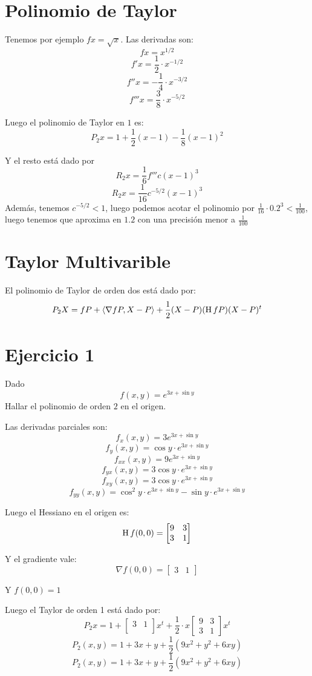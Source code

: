 \documentclass{article}
\begin{document}
\section*{Polinomio de Taylor}
Tenemos por ejemplo $fx = \sqrt{x}$. Las derivadas son:
\[f x = x^{1/2}\]
\[f' x = \frac{1}{2} \cdot x^{-1/2}\]
\[f'' x = -\frac{1}{4} \cdot x^{-3/2}\]
\[f''' x = \frac{3}{8} \cdot x^{-5/2}\]

Luego el polinomio de Taylor en $1$ es:
\[
	P_2x = 1 + \frac{1}{2}(x-1) - \frac{1}{8}(x-1)^2
\]

Y el resto está dado por \[
	R_2x = \frac{1}{6} f'''c (x-1)^3
\]
\[
	R_2x = \frac{1}{16} c ^{-5/2} (x-1)^3
\]
Además, tenemos $c^{-5/2} < 1$, luego podemos acotar el polinomio por $\frac{1}{16} \cdot 0.2^3 < \frac{1}{100}$, luego tenemos que aproxima en $1.2$ con una precisión menor a $\frac{1}{100}$

\section*{Taylor Multivarible}
El polinomio de Taylor de orden dos está dado por:
\[
	P_2X = fP + \langle \nabla fP, X-P \rangle + \frac{1}{2} (X-P) (\operatorname{H} f P) (X-P)^t
\]

\section*{Ejercicio 1}
Dado \[
	f (x,y) = e^{3x+\sin y}
\]
Hallar el polinomio de orden $2$ en el origen.

Las derivadas parciales son:
\[
	f_{x} (x,y) = 3e^{3x + \sin y}
\]
\[
	f_{y} (x,y) = \cos y \cdot e^{3x + \sin y}
\]
\[
	f_{xx} (x,y) = 9e^{3x + \sin y}
\]
\[
	f_{yx} (x,y) = 3\cos y \cdot e^{3x + \sin y}
\]
\[
f_{xy} (x,y) = 3 \cos y \cdot e^{3x + \sin y}
\]
\[
	f_{yy} (x,y) = \cos^2 y \cdot e^{3x + \sin y} - \sin y \cdot e^{3x + \sin y}
\]

Luego el Hessiano en el origen es:
\[
	\operatorname{H} f (0,0) = 
	\begin{bmatrix}
		9 & 3 \\
		3 & 1
	\end{bmatrix}
\]

Y el gradiente vale:
\[
	\nabla f (0,0) =
	\begin{bmatrix}
		3 & 1
	\end{bmatrix}
\]

Y $f (0,0) = 1$

Luego el Taylor de orden 1 está dado por:
\[
	P_2 x = 1 + 
	\begin{bmatrix}
		3 & 1 \\
	\end{bmatrix} x^t + 
	\frac{1}{2} \cdot x \begin{bmatrix}
		9 & 3 \\
		3 & 1
	\end{bmatrix} x^t
\]
\[
	P_2 (x,y) = 1 + 3x + y + \frac{1}{2}(9x^2 + y^2 + 6xy)
\]
\[
	P_2 (x,y) = 1 + 3x + y + \frac{1}{2}(9x^2 + y^2 + 6xy)
\]
\end{document}
